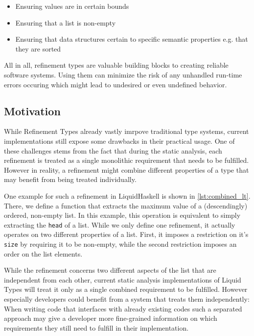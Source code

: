 \documentclass[acmsmall, review, screen]{acmart}
\begin{document}
\begin{itemize}
	\item Ensuring values are in certain bounds
	\item Ensuring that a list is non-empty
	\item Ensuring that data structures certain to specific semantic properties e.g. that they are sorted
\end{itemize}

All in all, refinement types are valuable building blocks to creating reliable software systems. Using them can minimize the risk of any unhandled run-time errors occuring which might lead to undesired or even undefined behavior.

\subsection{Motivation}

While Refinement Types already vastly imrpove traditional type systems, current implementations still expose some drawbacks in their practical usage. One of these challenges stems from the fact that during the static analysis, each refinement is treated as a single monolithic requirement that needs to be fulfilled. However in reality, a refinement might combine different properties of a type that may benefit from being treated individually.

One example for such a refinement in LiquidHaskell is shown in \ref{lst:combined_lt}. There, we define a function that extracts the maximum value of a (descendingly) ordered, non-empty list. In this example, this operation is equivalent to simply extracting the \texttt{head} of a list. While we only define one refinement, it actually operates on two different properties of a list. First, it imposes a restriction on it's \texttt{size} by requiring it to be non-empty, while the second restriction imposes an order on the list elements.



While the refinement concerns two different aspects of the list that are independent from each other, current static analysis implementations of Liquid Types will treat it only as a single combined requirement to be fulfilled. However especially developers could benefit from a system that treats them independently: When writing code that interfaces with already existing codes such a separated approach may give a developer more fine-grained information on which requirements they still need to fulfill in their implementation.
\end{document}
